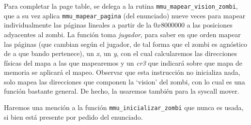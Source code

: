 \documentclass{article}
\begin{document}
	Para completar la page table, se delega a la rutina \texttt{mmu\_mapear\_vision\_zombi}, que a su vez aplica \texttt{mmu\_mapear\_pagina} (del enunciado) nueve veces para mapear individualmente las páginas lineales a partir de la $0x8000000$ a las posiciones adyacentes al zombi. La función toma \textit{jugador}, para saber en que orden mapear las páginas (que cambian según el jugador, de tal forma que el zombi es agnóstico de a que bando pertenece), un \textit{x}, un \textit{y}, con el cual calcularemos las direcciones físicas del mapa a las que mapearemos y un \textit{cr3} que indicará sobre que mapa de memoria se aplicará el mapeo. Observar que esta instrucción no inicializa nada, solo mapea las direcciones que componen la `vision' del zombi, con lo cual es una función bastante general. De hecho, la usaremos también para la syscall mover.
		
	Haremos una mención a la función \texttt{mmu\_inicializar\_zombi} que nunca es usada, si bien está presente por pedido del enunciado.
	
	
	
	
\end{document}
